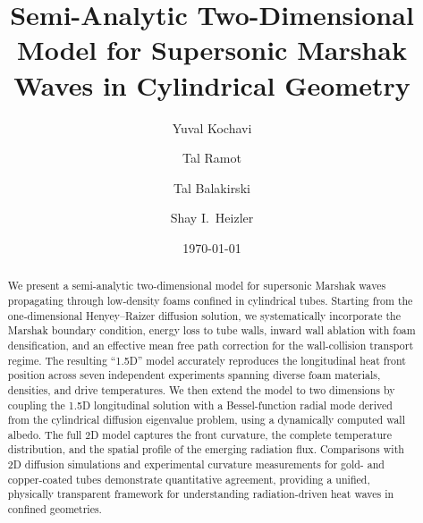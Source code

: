 \documentclass[prl, twocolumn, superscriptaddress, amsmath, amssymb, reprint]{revtex4-2}
\begin{document}
\title{Semi-Analytic Two-Dimensional Model for Supersonic Marshak Waves in Cylindrical Geometry}

\author{Yuval Kochavi}

\author{Tal Ramot}

\author{Tal Balakirski}

\author{Shay I.~Heizler}

\date{\today}

\begin{abstract}
We present a semi-analytic two-dimensional model for supersonic Marshak waves propagating through low-density foams confined in cylindrical tubes.
Starting from the one-dimensional Henyey--Raizer diffusion solution, we systematically incorporate the Marshak boundary condition, energy loss to tube walls, inward wall ablation with foam densification, and an effective mean free path correction for the wall-collision transport regime.
The resulting ``1.5D'' model accurately reproduces the longitudinal heat front position across seven independent experiments spanning diverse foam materials, densities, and drive temperatures.
We then extend the model to two dimensions by coupling the 1.5D longitudinal solution with a Bessel-function radial mode derived from the cylindrical diffusion eigenvalue problem, using a dynamically computed wall albedo.
The full 2D model captures the front curvature, the complete temperature distribution, and the spatial profile of the emerging radiation flux.
Comparisons with 2D diffusion simulations and experimental curvature measurements for gold- and copper-coated tubes demonstrate quantitative agreement, providing a unified, physically transparent framework for understanding radiation-driven heat waves in confined geometries.
\end{abstract}
\end{document}
